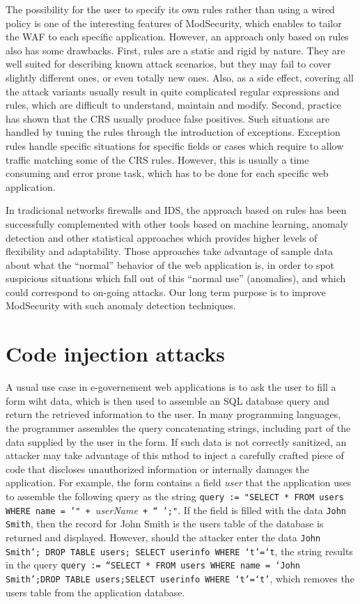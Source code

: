 \documentclass[runningheads,a4paper]{llncs}
\begin{document}
The possibility for the user to specify its own rules rather than using a wired policy is one of the interesting features of ModSecurity, which enables to tailor the WAF to each specific application. However, an approach only based on rules also has some drawbacks. First, rules are a static and rigid by nature. They are well suited for describing known attack scenarios, but they may fail to cover slightly different ones, or even totally new ones. Also, as a side effect, covering all the attack variants usually result in quite complicated regular expressions and rules, which are difficult to understand, maintain and modify. Second, practice has shown that the CRS usually produce false positives. Such situations are handled by tuning the rules through the introduction of exceptions. Exception rules handle specific situations for specific fields or cases which require to allow traffic matching some of the CRS rules. However, this is usually a time consuming and error prone task, which has to be done for each specific web application.

In tradicional networks firewalls and IDS, the approach based on rules has been successfully complemented with other tools based on machine learning, anomaly detection and other statistical approaches which provides higher levels of flexibility and adaptability. Those approaches take advantage of sample data about what the “normal” behavior of the web application is, in order to spot suspicious situations which fall out of this “normal use” (anomalies), and which could correspond to on-going attacks. Our long term purpose is to improve ModSecurity with such anomaly detection techniques.

\section{Code injection attacks}

A usual use case in e-governement web applications is to ask the user to fill a form wiht data, which is then used to assemble an SQL database query and return the retrieved information to the user. In many programming languages, the programmer assembles the query concatenating strings, including part of the data supplied by the user in the form. If such data is not correctly sanitized, an attacker may take advantage of this mthod to inject a carefully crafted piece of code that discloses unauthorized information or internally damages the application. For example, the form contains a field \textit{user} that the application uses to assemble the following query as the string \texttt{query := "SELECT * FROM users WHERE name = '" + }\textit{userName}\texttt{ + “ ';"}. If the field is filled with the data \texttt{John Smith}, then the record for John Smith is the users table of the database is returned and displayed. However, should the attacker enter the data \texttt{John Smith’; DROP TABLE users; SELECT userinfo WHERE ‘t’=‘t}, the string results in the query \texttt{query := ``SELECT * FROM users WHERE name = ‘John Smith’;DROP TABLE users;SELECT userinfo  WHERE ‘t’=‘t’}, which removes the users table from the application database. 
\end{document}
